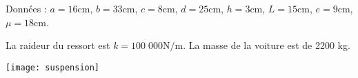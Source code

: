 Données : $a = 16 \text{cm}$, $b = 33 \text{cm}$, $c = 8 \text{cm}$, $d = 25 \text{cm}$, $h = 3 \text{cm}$, $L = 15 \text{cm}$, $e = 9 \text{cm}$, $\mu = 18 \text{cm}$. 

La raideur du ressort est $k = 100\;000 \text{N/m}$. La masse de la voiture est de 2200 kg.




\begin{center}
\texttt{[image: suspension]}
\end{center}

